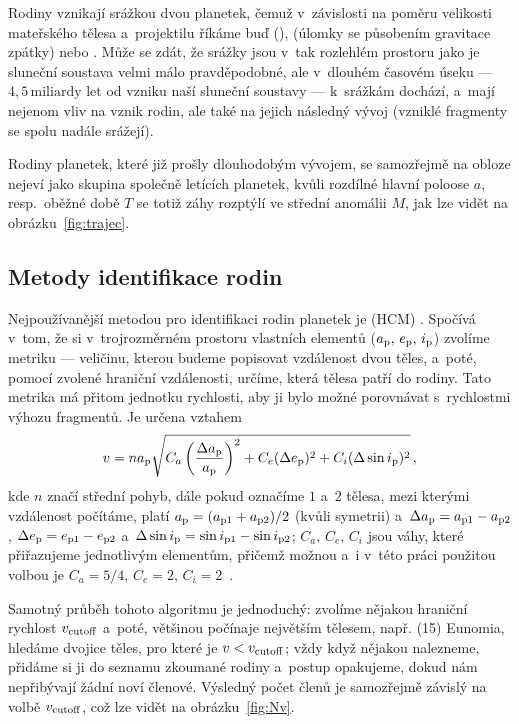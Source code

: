 \documentclass[A4paper, 12pt, oneside]{book}
\begin{document}
Rodiny vznikají srážkou dvou planetek, čemuž v~závislosti na poměru velikosti mateřského tělesa a~projektilu říkáme buď  (),  (úlomky se působením gravitace  zpátky) nebo . Může se zdát, že srážky jsou v~tak rozlehlém prostoru jako je sluneční soustava velmi málo pravděpodobné, ale v~dlouhém časovém úseku --- $4,5\,\text{miliardy let}$ od vzniku naší sluneční soustavy --- k~srážkám dochází, a~mají nejenom vliv na vznik rodin, ale také na jejich následný vývoj (vzniklé fragmenty se spolu nadále srážejí).

Rodiny planetek, které již prošly dlouhodobým vývojem, se samozřejmě na obloze nejeví jako skupina společně letících planetek, kvůli rozdílné hlavní poloose $a$, resp.\ oběžné době $T$ se totiž záhy rozptýlí ve střední anomálii $M$, jak lze vidět na obrázku~\ref{fig:trajec}.

\subsection{Metody identifikace rodin} \label{sec:metodyiden}
Nejpoužívanější metodou pro identifikaci rodin planetek je  (HCM) \cite{zappala90}. Spočívá v~tom, že si v~trojrozměrném prostoru vlastních elementů ($a_{\rm p},\,e_{\rm p},\,i_{\rm p}$) zvolíme metriku --- veličinu, kterou budeme popisovat vzdálenost dvou těles, a~poté, pomocí zvolené hraniční  vzdálenosti, určíme, která tělesa patří do rodiny. Tato metrika má přitom jednotku rychlosti, aby ji bylo možné porovnávat s~rychlostmi výhozu fragmentů. Je určena vztahem
\begin{align}
	v=na_{\rm p}\sqrt{C_a\left(\frac{\Delta a_{\rm p}}{a_{\rm p}}\right)^2+C_e(\Delta e_{\rm p})^2+C_i(\Delta \sin i_{\rm p})^2}\,,
\end{align}
kde $n$ značí střední pohyb, dále pokud označíme $1$ a~$2$ tělesa, mezi kterými vzdálenost počítáme, platí $a_{\rm p}=(a_{{\rm p}1}+a_{{\rm p}2})/2$ (kvůli symetrii) a~$\Delta a_{\rm p}=a_{{\rm p}1}-a_{{\rm p}2}$, $\Delta e_{\rm p}=e_{{\rm p}1}-e_{{\rm p}2}$ a~$\Delta \sin i_{\rm p}=\sin i_{{\rm p}1}-\sin i_{{\rm p}2}$; $C_a,\,C_e,\,C_i$ jsou váhy, které přiřazujeme jednotlivým elementům, přičemž možnou a~i v~této práci použitou volbou je $C_a=5/4$, $C_e=2$, $C_i=2$~\cite{zappala90}. 

Samotný průběh tohoto algoritmu je jednoduchý: zvolíme nějakou hraniční rychlost $v_{\rm cutoff}$ a~poté, většinou počínaje největším tělesem, např. (15) Eunomia, hledáme dvojice těles, pro které je $v<v_{\rm cutoff}$; vždy když nějakou nalezneme, přidáme si ji do seznamu zkoumané rodiny a~postup opakujeme, dokud nám nepřibývají žádní noví členové. Výsledný počet členů je samozřejmě závislý na volbě $v_{\rm cutoff}$, což lze vidět na obrázku~\ref{fig:Nv}.
\end{document}
